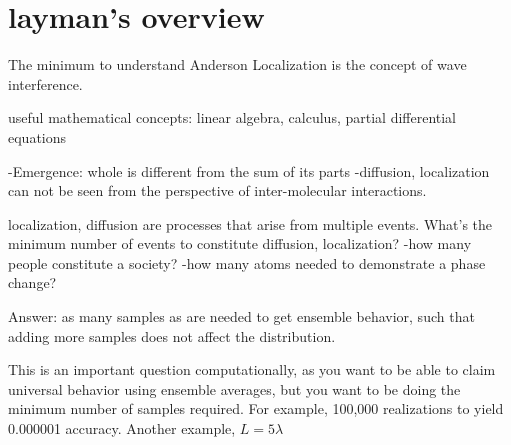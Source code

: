 \section{layman's overview}

The minimum to understand Anderson Localization is the concept of wave interference. 

useful mathematical concepts: linear algebra, calculus, partial differential equations

-Emergence: whole is different from the sum of its parts
   -diffusion, localization can not be seen from the perspective of inter-molecular interactions.

localization, diffusion are processes that arise from multiple events. What's the minimum number of events to constitute diffusion, localization?  
-how many people constitute a society? 
-how many atoms needed to demonstrate a phase change?

Answer: as many samples as are needed to get ensemble behavior, such that adding more samples does not affect the distribution.

This is an important question computationally, as you want to be able to claim universal behavior using ensemble averages, but you want to be doing the minimum number of samples required.  For example, 100,000 realizations to yield 0.000001 accuracy. Another example, $L=5 \lambda$